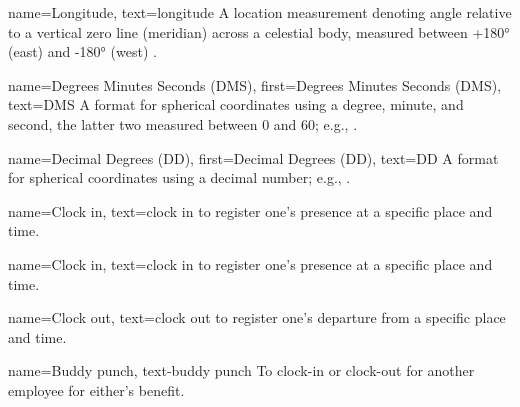 {
  name={Longitude},
  text={longitude}
}
{
  A location measurement denoting angle relative to a
  vertical zero line (meridian) across a celestial body,
  measured between +\ang{180} (east) and -\ang{180} (west)
  \parencite{coordSystems}.
}

{
  name={Degrees Minutes Seconds (DMS)},
  first={Degrees Minutes Seconds (DMS)},
  text={DMS}
}
{
  A format for spherical coordinates using a degree,
  minute,
  and second, the latter two measured between 0 and 60;
  e.g.,  \parencite{coordSystems}.
}

{
  name={Decimal Degrees (DD)},
  first={Decimal Degrees (DD)},
  text={DD}
}
{
  A format for spherical coordinates using a decimal
  number;
  e.g.,  \parencite{coordSystems}.
}

{
  name={Clock in},
  text={clock in}
}
{
  to register one's presence at a specific place and time.
}

{
  name={Clock in},
  text={clock in}
}
{
  to register one's presence at a specific place and time.
}

{
  name={Clock out},
  text={clock out}
}
{
  to register one's departure from a specific place and
  time.
}

{
  name={Buddy punch},
  text-{buddy punch}
}
{
  To clock-in or clock-out for another employee for either's
  benefit. 
}